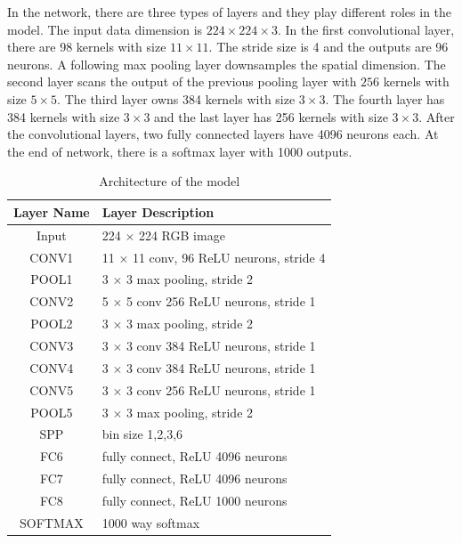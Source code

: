 In the network, there are three types of layers and they play different roles in the model. The input data dimension is $224\times224\times3$. In the first convolutional layer, there are 98 kernels with size $11\times11$. The stride size is 4 and the outputs are 96 neurons. A following max pooling layer downsamples the spatial dimension. The second layer scans the output of the previous pooling layer with $256$ kernels with size $5\times5$. The third layer owns 384 kernels with size $3\times3$. The fourth layer has 384 kernels with size $3\times3$ and the last layer has 256 kernels with size $3\times3$. After the convolutional layers, two fully connected layers have 4096 neurons each. At the end of network, there is a softmax layer with 1000 outputs.
\begin{table}[h]
\begin{center}
    \begin{tabular}{ | c | p{8cm} | }
    \hline
    Layer Name & Layer Description \\ \hline
    Input & 224 $\times$ 224 RGB image \\ \hline
    CONV1 & 11 $\times$ 11 conv, 96 ReLU neurons, stride 4 \\ \hline
    POOL1 & 3 $\times$ 3 max pooling, stride 2 \\ \hline
    CONV2 & 5 $\times$ 5 conv 256 ReLU neurons, stride 1 \\ \hline
    POOL2 & 3 $\times$ 3 max pooling, stride 2 \\ \hline
    CONV3 & 3 $\times$ 3 conv 384 ReLU neurons, stride 1 \\ \hline
    CONV4 & 3 $\times$ 3 conv 384 ReLU neurons, stride 1 \\ \hline
    CONV5 & 3 $\times$ 3 conv 256 ReLU neurons, stride 1 \\ \hline
    POOL5 & 3 $\times$ 3 max pooling, stride 2 \\ \hline
    SPP & bin size 1,2,3,6 \\ \hline
    FC6 & fully connect, ReLU 4096 neurons\\ \hline
    FC7 & fully connect, ReLU 4096 neurons\\ \hline
    FC8 & fully connect, ReLU 1000 neurons\\ \hline
    SOFTMAX & 1000 way softmax\\ \hline
    \end{tabular}
    \caption{Architecture of the model}
    \label{fig:NetPara}
\end{center}
\end{table}

















